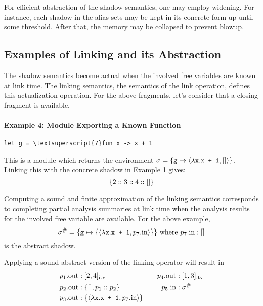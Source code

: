 \documentclass{article}
\begin{document}
For efficient abstraction of the shadow semantics, one may employ widening.
For instance, each shadow in the alias sets may be kept in its concrete form
up until some threshold. After that, the memory may be collapsed to prevent blowup.

\subsection{Examples of Linking and its Abstraction}
The shadow semantics become actual when the involved free variables
are known at link time. The linking semantics, the semantics of the link
operation, defines this actualization operation. For the above fragments, let's
consider that a closing fragment is available.

\paragraph{Example 4: Module Exporting a Known Function}
\begin{center}
  \begin{BVerbatim}[commandchars=\\\{\}]
let g = \textsuperscript{7}fun x -> x + 1
  \end{BVerbatim}
\end{center}
This is a module which returns the environment
$\sigma=\{\texttt{g}\mapsto\langle\lambda\texttt{x}.\texttt{x + 1},[]\rangle\}$.
Linking this with the concrete shadow in Example 1 gives:
\[\{2::3::4::[]\}\]

Computing a sound and finite approximation of the linking semantics
corresponds to completing partial analysis summaries at link time when
the analysis results for the involved free variable are available. For
the above example,
\[
  {\sigma}^{\#}=\{\texttt{g}\mapsto\{\langle\lambda\texttt{x}.\texttt{x + 1},p_7.\text{in}\rangle\}\}\text{ where }
  p_7.\text{in}:[]
\]
is the abstract shadow.

Applying a sound abstract version of the linking operator will result in
\begin{align*}
  p_1.\text{out} & :[2,4]_{\text{itv}}                                                     &  &  & p_4.\text{out} & :[1,3]_{\text{itv}} \\
  p_2.\text{out} & :\{[],p_1:: p_2\}                                        &  &  & p_5.\text{in}  & :{\sigma}^{\#}           \\
  p_3.\text{out} & :\{\langle\lambda\texttt{x}.\texttt{x + 1},p_7.\text{in}\rangle\} &  &  &
\end{align*}
\end{document}
